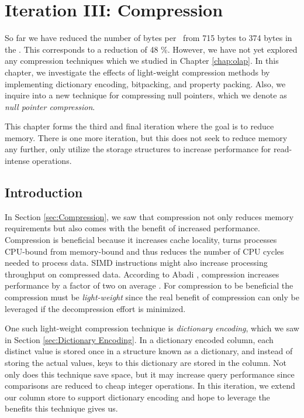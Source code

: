\chapter{Iteration III: Compression}
\label{chap:compression}
So far we have reduced the number of bytes per \lineitem~from 715 bytes to 374 bytes in the \tpchdl. This corresponds to a reduction of 48 \%. However, we have not yet explored any compression techniques which we studied in Chapter \ref{chap:olap}. In this chapter, we investigate the effects of light-weight compression methods by implementing dictionary encoding, bitpacking, and property packing. Also, we inquire into a new technique for compressing null pointers, which we denote as \textit{null pointer compression}. 

This chapter forms the third and final iteration where the goal is to reduce memory. There is one more iteration, but this does not seek to reduce memory any further, only utilize the storage structures to increase performance for read-intense operations.

\clearpage

\section{Introduction}
\label{sec:Introduction}
In Section \ref{sec:Compression}, we saw that compression not only reduces memory requirements but also comes with the benefit of increased performance. Compression is beneficial because it increases cache locality, turns processes CPU-bound from memory-bound and thus reduces the number of CPU cycles needed to process data. SIMD instructions might also increase processing throughput on compressed data. According to Abadi \ea, compression increases performance by a factor of two on average \cite{Abadi2008-dd}. For compression to be beneficial the compression must be \textit{light-weight} since the real benefit of compression can only be leveraged if the decompression effort is minimized.

One such light-weight compression technique is \textit{dictionary encoding}, which we saw in Section \ref{sec:Dictionary Encoding}. In a dictionary encoded column, each distinct value is stored once in a structure known as a dictionary, and instead of storing the actual values, keys to this dictionary are stored in the column. Not only does this technique save space, but it may increase query performance since comparisons are reduced to cheap integer operations. In this iteration, we extend our column store to support dictionary encoding and hope to leverage the benefits this technique gives us.

